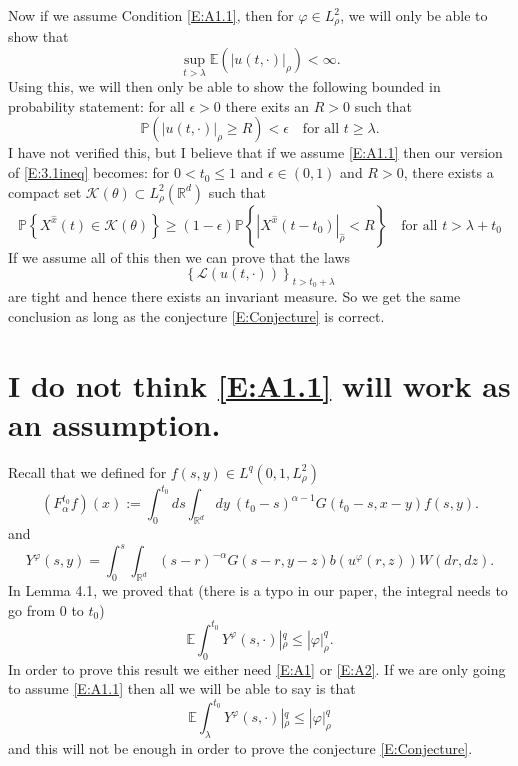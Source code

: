\documentclass{article}
\numberwithin{equation}{section}
\newcommand{\R}{\mathbb{R}}
\begin{document}
Now if we assume Condition \eqref{E:A1.1}, then for $\varphi \in L^2_{\rho}$, we will only be able to show that
	\[
		\sup_{t>\lambda} \mathbb{E} \left( |u(t,\cdot)|_{\rho} \right) < \infty.
	\]
Using this, we will then only be able to show the following bounded in probability statement: for all $\epsilon >0$ there exits an $R>0$ such that
	\[
		 \mathbb{P} \left( |u(t,\cdot)|_{\rho} \ge R \right) < \epsilon \quad \text{for all } t \ge \lambda.
	\]
I have not verified this, but I believe that if we assume \eqref{E:A1.1} then our version of \eqref{E:3.1ineq} becomes: for $0 < t_0 \le 1$ and $\epsilon \in (0,1)$ and $R>0$, there exists a compact set $\mathscr{K}(\theta) \subset L^2_{\rho}(\R^d)$ such that
	\begin{equation}\label{E:Conjecture}
			\mathbb{P}\left\{ X^{\hat x}(t) \in \mathscr{K}(\theta) \right\} \ge (1-\epsilon)\mathbb{P} \left\{ | X^{\hat x}(t-t_0)|_{\hat \rho} < R \right\} \quad \text{for all } t> \lambda + t_0
	\end{equation}
If we assume all of this then we can prove that the laws
	\[
		\left\{\mathscr{L}(u(t,\cdot))\right\}_{t>t_0 + \lambda}
	\]
are tight and hence there exists an invariant measure. So we get the same conclusion as long as the conjecture \eqref{E:Conjecture} is correct.

\section{I do not think \eqref{E:A1.1} will work as an assumption.}

Recall that we defined for $f(s,y) \in L^q(0,1,L^2_{\rho})$
	\[
		\left(F_{\alpha}^{t_0} f\right)(x) := \int_0^{t_0} ds \int_{\R^d} dy \: (t_0-s)^{\alpha-1}G(t_0-s,x-y)f(s,y) .
	\]
and
	\[
		Y^\varphi(s,y) =\int_0^s \int_{\R^d} (s-r)^{-\alpha}G(s-r,y-z)b(u^\varphi(r,z))W(dr,dz).
	\]
In Lemma 4.1, we proved that (there is a typo in our paper, the integral needs to go from $0$ to $t_0$)
	\begin{equation}\label{E:YNorm}
		\mathbb{E}\int_0^{t_0} Y^{\varphi}(s,\cdot)|_{\rho}^q \le |\varphi|_\rho^q.
	\end{equation}
In order to prove this result we either need \eqref{E:A1} or \eqref{E:A2}. If we are only going to assume \eqref{E:A1.1} then all we will be able to say is that
	\begin{equation}\label{E:YNorm1.1}
		\mathbb{E}\int_\lambda^{t_0} Y^{\varphi}(s,\cdot)|_{\rho}^q \le |\varphi|_\rho^q
	\end{equation}
and this will not be enough in order to prove the conjecture \eqref{E:Conjecture}.
\end{document}
